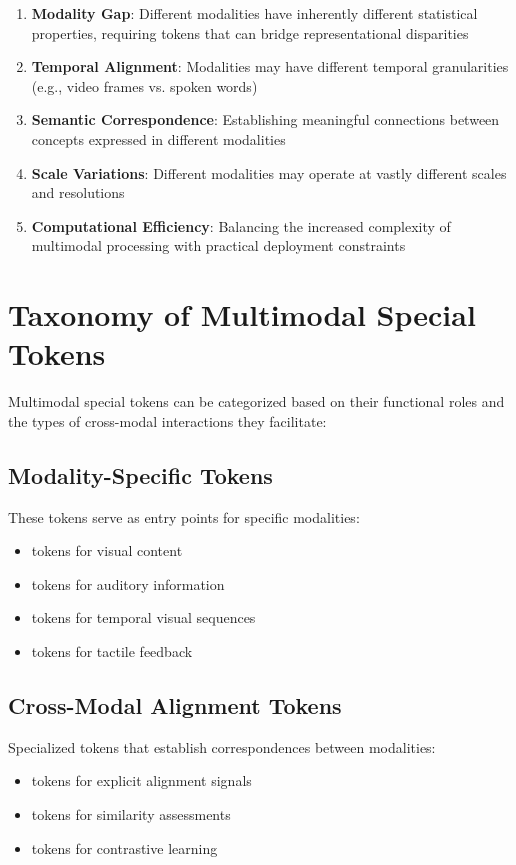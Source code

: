 \begin{enumerate}
\item \textbf{Modality Gap}: Different modalities have inherently different statistical properties, requiring tokens that can bridge representational disparities
\item \textbf{Temporal Alignment}: Modalities may have different temporal granularities (e.g., video frames vs. spoken words)
\item \textbf{Semantic Correspondence}: Establishing meaningful connections between concepts expressed in different modalities
\item \textbf{Scale Variations}: Different modalities may operate at vastly different scales and resolutions
\item \textbf{Computational Efficiency}: Balancing the increased complexity of multimodal processing with practical deployment constraints
\end{enumerate}

\section{Taxonomy of Multimodal Special Tokens}

Multimodal special tokens can be categorized based on their functional roles and the types of cross-modal interactions they facilitate:

\subsection{Modality-Specific Tokens}
These tokens serve as entry points for specific modalities:
\begin{itemize}
\item \img{} tokens for visual content
\item {} tokens for auditory information
\item {} tokens for temporal visual sequences
\item {} tokens for tactile feedback
\end{itemize}

\subsection{Cross-Modal Alignment Tokens}
Specialized tokens that establish correspondences between modalities:
\begin{itemize}
\item {} tokens for explicit alignment signals
\item {} tokens for similarity assessments
\item {} tokens for contrastive learning
\end{itemize}

